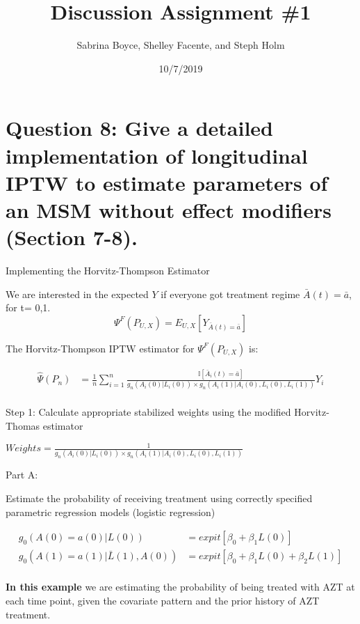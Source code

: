 \documentclass[ignorenonframetext,]{beamer}
\title{Discussion Assignment \#1}
\author{Sabrina Boyce, Shelley Facente, and Steph Holm}
\date{10/7/2019}
\begin{document}
\frame{\titlepage}

\section{Question 8: Give a detailed implementation of longitudinal IPTW
to estimate parameters of an MSM without effect modifiers (Section
7-8).}\label{question-8-give-a-detailed-implementation-of-longitudinal-iptw-to-estimate-parameters-of-an-msm-without-effect-modifiers-section-7-8.}

\begin{frame}{Implementing the Horvitz-Thompson Estimator}

We are interested in the expected \(Y\) if everyone got treatment regime
\(\bar{A}(t) = \bar{a}\), for t= 0,1.
\[ \Psi^F(P_{U,X}) = E_{U,X}[Y_{\bar{A}(t)=\bar{a}}] \]

The Horvitz-Thompson IPTW estimator for \(\Psi^F\left(P_{U,X}\right)\)
is:

\begin{align*}
\hat{\Psi}(P_n) & =\frac{1}{n}\sum_{i=1}^n\frac{\mathbb{I}[\bar{A}_i(t)=\bar{a}]}{g_n(A_i(0)|L_i(0))\times g_n(A_i(1)|A_i(0), L_i(0), L_i(1))}Y_i\\
\end{align*}

\end{frame}

\begin{frame}{Step 1: Calculate appropriate stabilized weights using the
modified Horvitz-Thomas estimator}

\(Weights = \frac{1}{g_n(A_i(0) | L_i(0))\times g_n(A_i(1) | A_i(0), L_i(0), L_i(1))}\)

\vspace{6 mm}

\begin{block}{Part A:}

Estimate the probability of receiving treatment using correctly
specified parametric regression models (logistic regression)

\begin{align*}
g_0(A(0)=a(0)|L(0)) &= expit[\beta_0 + \beta_1 L(0)] \\
g_0(A(1)=a(1)|\bar{L}(1), A(0)) &= expit[\beta_0 + \beta_1 L(0) + \beta_2 L(1)] \\
\end{align*}

\textbf{In this example} we are estimating the probability of being
treated with AZT at each time point, given the covariate pattern and the
prior history of AZT treatment.

\end{block}

\end{frame}
\end{document}
